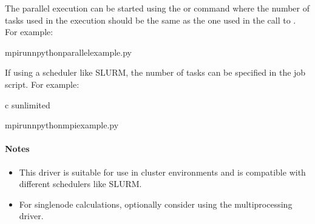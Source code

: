 \documentclass[letterpaper,10pt,english]{sphinxmanual}
\begin{document}
\sphinxAtStartPar
The parallel execution can be started using the  or  command where the number of tasks
used in the execution should be the same as the one used in the call to . For example:

\begin{sphinxVerbatim}[commandchars=\\\{\}]
mpirun\PYGZhy{}npythonparallel\PYGZus{}example.py
\end{sphinxVerbatim}

\sphinxAtStartPar
If using a scheduler like SLURM, the number of tasks can be specified in the job script. For example:

\begin{sphinxVerbatim}[commandchars=\\\{\}]

\PYGZhy{}c
\PYGZhy{}sunlimited

mpirun\PYGZhy{}npythonmpi\PYGZus{}example.py
\end{sphinxVerbatim}


\paragraph{Notes}
\label{\detokenize{user_guide/drivers/parallel_driver_mpi:notes}}\begin{itemize}
\item {} 
\sphinxAtStartPar
This driver is suitable for use in cluster environments and is compatible with different schedulers like SLURM.

\item {} 
\sphinxAtStartPar
For single\sphinxhyphen{}node calculations, optionally consider using the multiprocessing driver.

\end{itemize}
\end{document}
